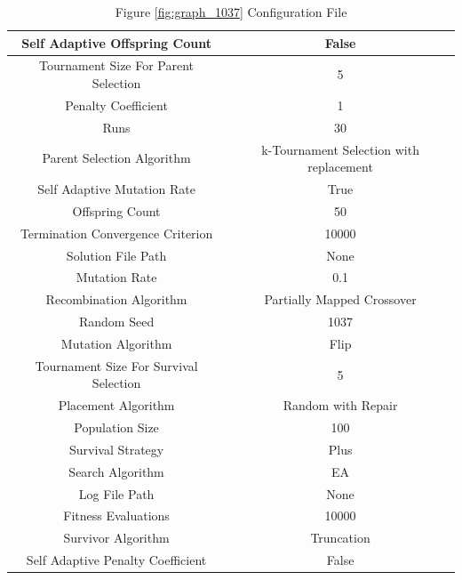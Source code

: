 \documentclass{standalone}
\begin{document}
\begin{table}[!htb]
	\centering
	\caption{Figure \ref{fig:graph_1037} Configuration File}
	\label{tab:graph_1037}
	\begin{tabular}{| c | c |}
		\hline
		Self Adaptive Offspring Count		& False		 \\
		\hline
		Tournament Size For Parent Selection		& 5		 \\
		\hline
		Penalty Coefficient		& 1		 \\
		\hline
		Runs		& 30		 \\
		\hline
		Parent Selection Algorithm		& k-Tournament Selection with replacement		 \\
		\hline
		Self Adaptive Mutation Rate		& True		 \\
		\hline
		Offspring Count		& 50		 \\
		\hline
		Termination Convergence Criterion		& 10000		 \\
		\hline
		Solution File Path		& None		 \\
		\hline
		Mutation Rate		& 0.1		 \\
		\hline
		Recombination Algorithm		& Partially Mapped Crossover		 \\
		\hline
		Random Seed		& 1037		 \\
		\hline
		Mutation Algorithm		& Flip		 \\
		\hline
		Tournament Size For Survival Selection		& 5		 \\
		\hline
		Placement Algorithm		& Random with Repair		 \\
		\hline
		Population Size		& 100		 \\
		\hline
		Survival Strategy		& Plus		 \\
		\hline
		Search Algorithm		& EA		 \\
		\hline
		Log File Path		& None		 \\
		\hline
		Fitness Evaluations		& 10000		 \\
		\hline
		Survivor Algorithm		& Truncation		 \\
		\hline
		Self Adaptive Penalty Coefficient		& False		 \\
		\hline
	\end{tabular}
\end{table}
\end{document}
